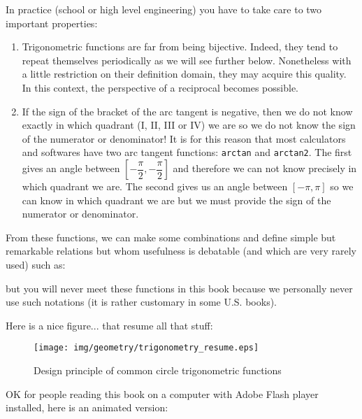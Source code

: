 In practice (school or high level engineering) you have to take care to two important properties: 
	\begin{enumerate}
		\item Trigonometric functions are far from being bijective. Indeed, they tend to repeat themselves periodically as we will see further below. Nonetheless with a little restriction on their definition domain, they may acquire this quality. In this context, the perspective of a reciprocal becomes possible.
		\item If the sign of the bracket of the arc tangent is negative, then we do not know exactly in which quadrant (I, II, III or IV) we are so we do not know the sign of the numerator or denominator! It is for this reason that most calculators and softwares have two arc tangent functions: \texttt{arctan} and \texttt{arctan2}. The first gives an angle between $\left[-\dfrac{\pi}{2},-\dfrac{\pi}{2}\right]$ and therefore we can not know precisely in which quadrant we are. The second gives us an angle between $\left[-\pi,\pi\right]$ so we can know in which quadrant we are but we must provide the sign of the numerator or denominator.
	\end{enumerate}

	From these functions, we can make some combinations and define simple but remarkable relations but whom usefulness is debatable (and which are very rarely used) such as:
	
	but you will never meet these functions in this book because we personally never use such notations (it is rather customary in some U.S. books).
	
	Here is a nice figure... that resume all that stuff:
	
	\begin{figure}[H]
	\centering
	\texttt{[image: img/geometry/trigonometry\_resume.eps]}
	\caption{Design principle of common circle trigonometric functions}
	\end{figure}
	
	OK for people reading this book on a computer with Adobe Flash player installed, here is an animated version:
	\begin{center}
	\centering
	\end{center}

